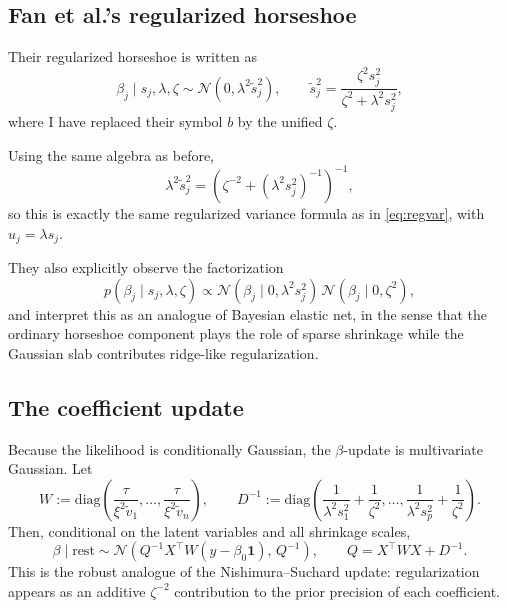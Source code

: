 \documentclass[11pt]{article}
\newcommand{\Normal}{\mathcal{N}}
\newcommand{\diag}{\mathrm{diag}}
\begin{document}
\subsection{Fan et al.'s regularized horseshoe}

Their regularized horseshoe is written as
\begin{equation}
\beta_j \mid s_j,\lambda,\zeta \sim \Normal(0,\lambda^2 \tilde s_j^2),
\qquad
\tilde s_j^2 = \frac{\zeta^2 s_j^2}{\zeta^2 + \lambda^2 s_j^2},
\label{eq:fan-rhs}
\end{equation}
where I have replaced their symbol $b$ by the unified $\zeta$.

Using the same algebra as before,
\begin{equation}
\lambda^2 \tilde s_j^2
=
\left(\zeta^{-2} + (\lambda^2 s_j^2)^{-1}\right)^{-1},
\label{eq:fan-regvar}
\end{equation}
so this is exactly the same regularized variance formula as in \eqref{eq:regvar}, with $u_j=\lambda s_j$.

They also explicitly observe the factorization
\begin{equation}
p(\beta_j \mid s_j,\lambda,\zeta)
\propto
\Normal(\beta_j \mid 0,\lambda^2 s_j^2)\,
\Normal(\beta_j \mid 0,\zeta^2),
\label{eq:fan-product}
\end{equation}
and interpret this as an analogue of Bayesian elastic net, in the sense that the ordinary horseshoe component plays the role of sparse shrinkage while the Gaussian slab contributes ridge-like regularization.

\subsection{The coefficient update}

Because the likelihood is conditionally Gaussian, the $\beta$-update is multivariate Gaussian. Let
\[
W := \diag\!\left(\frac{\tau}{\xi^2 \tilde v_1},\dots,\frac{\tau}{\xi^2 \tilde v_n}\right),
\qquad
D^{-1}:=\diag\!\left(\frac{1}{\lambda^2 s_1^2}+\frac{1}{\zeta^2},\dots,\frac{1}{\lambda^2 s_p^2}+\frac{1}{\zeta^2}\right).
\]
Then, conditional on the latent variables and all shrinkage scales,
\begin{equation}
\beta \mid \text{rest}
\sim
\Normal\!\left(Q^{-1}X^\top W(y-\beta_0\mathbf{1}),\,Q^{-1}\right),
\qquad
Q = X^\top W X + D^{-1}.
\label{eq:fan-beta-update}
\end{equation}
This is the robust analogue of the Nishimura--Suchard update: regularization appears as an additive $\zeta^{-2}$ contribution to the prior precision of each coefficient.
\end{document}
